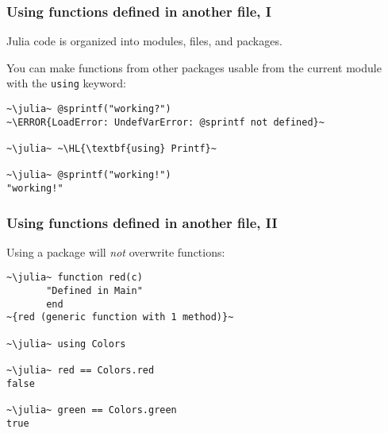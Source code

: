 \documentclass[english,serif,mathserif,xcolor=pdftex,dvipsnames,table]{beamer}
\begin{document}




\begin{frame}[fragile]
  \frametitle{Using functions defined in another file, I}
  \small

  Julia code is organized into modules, files, and packages.

  \+ You can make functions from other packages usable from the
  current module with the \texttt{using} keyword:
\begin{lstlisting}
~\julia~ @sprintf("working?")
~\ERROR{LoadError: UndefVarError: @sprintf not defined}~

~\julia~ ~\HL{\textbf{using} Printf}~

~\julia~ @sprintf("working!")
"working!"
\end{lstlisting}
\end{frame}

\begin{frame}
  \frametitle{Using functions defined in another file, II}
  Using a package will \emph{not} overwrite functions:
\begin{lstlisting}
~\julia~ function red(c)
       "Defined in Main"
       end
~{red (generic function with 1 method)}~

~\julia~ using Colors

~\julia~ red == Colors.red
false

~\julia~ green == Colors.green
true
\end{lstlisting}
\end{frame}
\end{document}
